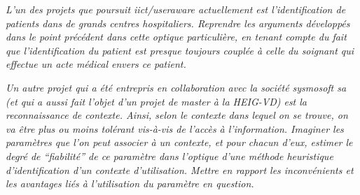 \documentclass[a4paper,11pt,titlepage]{article}
\begin{document}
\textit{L'un des projets que poursuit iict/useraware actuellement est l'identification de patients dans de
grands centres hospitaliers. Reprendre les arguments développés dans le point précédent dans cette
optique particulière, en tenant compte du fait que l'identification du patient est presque toujours couplée à
celle du soignant qui effectue un acte médical envers ce patient.}

\textit{Un autre projet qui a été entrepris en collaboration avec la société sysmosoft sa (et qui a aussi fait
l'objet d'un projet de master à la HEIG-VD) est la reconnaissance  de contexte. Ainsi, selon le contexte dans
lequel on se trouve, on va être plus ou moins tolérant vis-à-vis de l'accès à l'information. Imaginer les
paramètres que l'on peut associer à un contexte, et pour chacun d'eux, estimer le degré de ``fiabilité'' de
ce paramètre dans l'optique d'une méthode heuristique d'identification d'un contexte d'utilisation. Mettre
en rapport les inconvénients et les avantages liés à l'utilisation du paramètre en question.}
\end{document}
